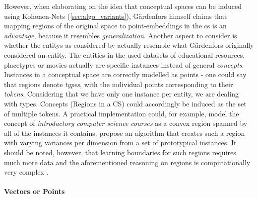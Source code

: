 However, when elaborating on the idea that conceptual spaces can be induced using Kohonen-Nets (\autoref{sec:algo_variants}), Gärdenfors himself claims that mapping regions of the original space to point-embeddings in the \gls{cs} is an \textit{advantage}, because it resembles \textit{generalization}. Another aspect to consider is whether the \glspl{entity} as considered by \mainalgos actually resemble what Gärdenfors originally considered an entity. The entities in the used datasets of educational resources, placetypes or movies actually are specific instances instead of general \textit{concepts}. Instances in a conceptual space are correctly modelled as points - one could say that regions denote \textit{types}, with the individual points corresponding to their \textit{tokens}. Considering that we have only one instance per entity, we are dealing with types. Concepts (Regions in a CS) could accordingly be induced as the set of multiple tokens. A practical implementation could, for example, model the concept of \textit{introductory computer science courses} as a convex region spanned by all of the instances it contains. \textcite{Erk2009} propose an algorithm that creates such a region with varying variances per dimension from a set of prototypical instances. It should be noted, however, that learning boundaries for such regions requires much more data \cite{Derrac2015} and the aforementioned reasoning on regions is computationally very complex \cite{Hernandez-Conde2017}.


\paragraph{Vectors or Points}
\label{sec:discuss_points}

